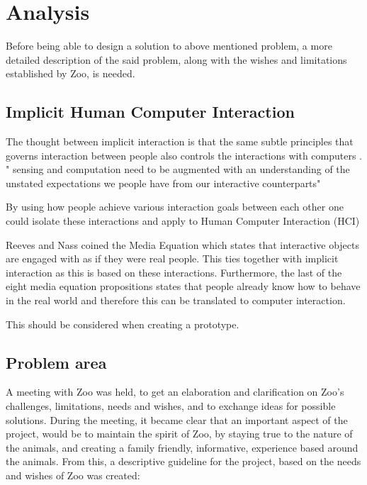 \chapter{Analysis}\label{chap:analysis}
Before being able to design a solution to above mentioned problem, a more detailed description of the said problem, along with the wishes and limitations established by Zoo, is needed. 

\section{Implicit Human Computer Interaction}

The thought between implicit interaction is that the same subtle principles that governs interaction between people also controls the interactions with computers \cite{Schmidt2000}. " sensing
and computation need to be augmented with an understanding of the unstated expectations we
people have from our interactive counterparts"

By using how people achieve various interaction goals between each other one could isolate these interactions and apply to Human Computer Interaction (HCI)

Reeves and Nass coined the Media Equation which states that \cite{mediaequation} interactive objects are engaged with as if they were real people. This ties together with implicit interaction as this is based on these interactions. Furthermore, the last of the eight media equation propositions states that people already know how to behave in the real world and therefore this can be translated to computer interaction.

This should be considered when creating a prototype.


\section{Problem area}
A meeting with Zoo was held, to get an elaboration and clarification on Zoo's challenges, limitations, needs and wishes, and to exchange ideas for possible solutions. During the meeting, it became clear that an important aspect of the project, would be to maintain the spirit of Zoo, by staying true to the nature of the animals, and creating a family friendly, informative, experience based around the animals.
From this, a descriptive guideline for the project, based on the needs and wishes of Zoo was created:  


